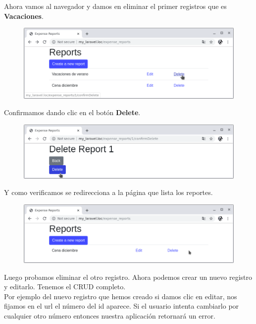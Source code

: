 \documentclass{article}
\begin{document}
Ahora vamos al navegador y damos en eliminar el primer registros que es
\textbf{Vacaciones}.

\begin{figure}[h!]
  \centering
  \includegraphics[scale=0.5]{./Pictures/080_eliminar_vacaciones.png}
\end{figure}

Confirmamos dando clic en el botón \textbf{Delete}.

\begin{figure}[h!]
  \centering
  \includegraphics[scale=0.5]{./Pictures/081_delete_confirm.png}
\end{figure}

Y como verificamos se redirecciona a la página que lista los reportes.

\begin{figure}[h!]
  \centering
  \includegraphics[scale=0.5]{./Pictures/082_delete_ok.png}
\end{figure}

Luego probamos eliminar el otro registro. Ahora podemos crear un nuevo registro
y editarlo. Tenemos el CRUD completo.\\

Por ejemplo del nuevo registro que hemos creado si damos clic en editar, nos
fijamos en el url el número del id aparece. Si el usuario intenta cambiarlo por
cualquier otro número entonces nuestra aplicación retornará un error.
\end{document}
